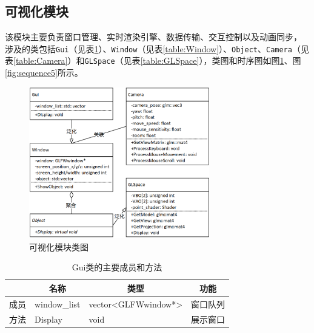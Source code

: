 \subsection{可视化模块}

\par 该模块主要负责窗口管理、实时渲染引擎、数据传输、交互控制以及动画同步，
涉及的类包括\texttt{Gui}（见表\ref{table:Gui}）、\texttt{Window}（见表\ref{table:Window}）、\texttt{Object}、\texttt{Camera}（见表\ref{table:Camera}）和\texttt{GLSpace}（见表\ref{table:GLSpace}），类图和时序图如图\ref{fig:class5}、图\ref{fig:sequence5}所示。

\begin{figure}[htbp]
	\centering
	\includegraphics[width=0.7\textwidth]{figures/uml/class5.png}
	\caption{可视化模块类图}
	\label{fig:class5}
\end{figure}

\begin{table}[htbp]
	\centering
	\caption{Gui类的主要成员和方法}
	\label{table:Gui}
	\begin{tabular}{|l|m{3cm}|m{5cm}|m{4cm}|}
		\hline
		   & \multicolumn{1}{c|}{名称}                & \multicolumn{1}{c|}{类型}                                                   & \multicolumn{1}{c|}{功能}        \\
		\hline
		成员 & \centering\arraybackslash window\_list & \centering\arraybackslash vector\textless{}GLFWwindow*\textgreater{} & \centering\arraybackslash 窗口队列 \\
		\hline
		方法 & \centering\arraybackslash  Display     & \centering\arraybackslash void                                            & \centering\arraybackslash 展示窗口 \\
		\hline
	\end{tabular}
\end{table}

